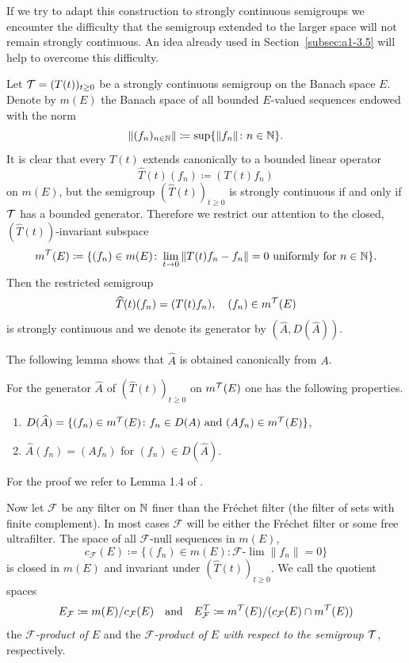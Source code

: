 If we try to adapt this construction to strongly continuous semigroups we encounter the difficulty that the semigroup extended to the larger space will not remain strongly continuous.
An idea already used in Section~\ref{subsec:a1-3.5} will help to overcome this difficulty.

Let $\TT = (T(t))_{t \geq 0}$ be a strongly continuous semigroup on the Banach space $E$.
Denote by $m(E)$ the Banach space of all bounded $E$-valued sequences endowed with the norm
\[
    \|(f_{n})_{n \in \mathbb{N}}\| \coloneq \sup \{\|f_{n}\| \colon n \in \mathbb{N}\} .
\]
It is clear that every $T(t)$ extends canonically to a bounded linear operator
\[
    \widehat{T}(t)(f_{n}) \coloneq (T(t)f_{n})
\]
on $m(E)$, but the semigroup $(\widehat{T}(t))_{t \geq 0}$ is strongly continuous if and only if\/ $\mathcal{T}$ has a bounded generator.
Therefore we restrict our attention to the closed, $(\widehat{T}(t))$-invariant subspace
\[
    m^{\mathcal{T}}(E) \coloneq \{(f_{n}) \in m(E) \colon \lim_{t \to 0} \|T(t)f_{n}-f_{n}\| = 0 \text{ uniformly for } n \in \mathbb{N}\} .
\]
Then the restricted semigroup
\[
    \widehat{T}(t)(f_{n}) = (T(t)f_{n}), \quad (f_{n}) \in m^{\mathcal{T}}(E)
\]
is strongly continuous and we denote its generator by $(\widehat{A},D(\widehat{A}))$.

The following lemma shows that $\widehat{A}$ is obtained canonically from $A$.
\begin{lemma*}\label{lem:a1-3.6}
For the generator $\widehat{A}$ of\/ $(\widehat{T}(t))_{t \geq 0}$ on $m^{\mathcal{T}}(E)$ one has the following properties.
\begin{enumerate}[\upshape(i)]

\item 
$D(\widehat{A}) = \{(f_{n}) \in m^{\mathcal{T}}(E) \colon f_{n} \in D(A) \text{ and } (Af_{n}) \in m^{\mathcal{T}}(E)\}$,

\item 
$\widehat{A}(f_{n}) = (Af_{n})$ for $(f_{n}) \in D(\widehat{A})$.
\end{enumerate}
\end{lemma*}
For the proof we refer to Lemma 1.4 of \textcite{derndinger:1980}.

Now let $\mathcal{F}$ be any filter on $\mathbb{N}$ finer than the Fréchet filter (\ie the filter of sets with finite complement). In most cases $\mathcal{F}$ will be either the Fréchet filter or some free ultrafilter.
The space of all $\mathcal{F}$-null sequences in $m(E)$, \ie
\[
    c_{\mathcal{F}}(E) \coloneq \{(f_{n}) \in m(E) \colon \mathcal{F}\text{-}\lim\|f_{n}\| = 0\}
\]
is closed in $m(E)$ and invariant under $(\widehat{T}(t))_{t \geq 0}$. 
We call the quotient spaces
\[
    E_{\mathcal{F}} \coloneq m(E)/c_{\mathcal{F}}(E) 
    \quad \text{and} \quad 
    E_{\mathcal{F}}^{\mathcal{T}} \coloneq m^{\mathcal{T}}(E)/ (c_{\mathcal{F}}(E)\cap m^{\mathcal{T}}(E))
\]
the \emph{$\mathcal{F}$-product of\/ $E$} and the \emph{$ \mathcal{F} $-product of\/ $E$ with respect to the semigroup $\mathcal{T}$}, respectively.

